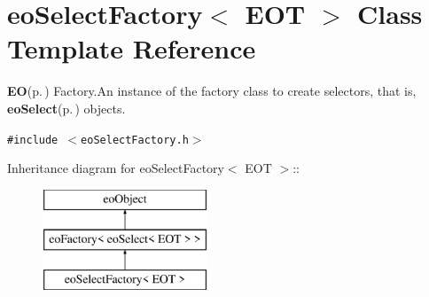 \section{eo\-Select\-Factory$<$ EOT $>$ Class Template Reference}
\label{classeo_select_factory}
{\bf EO}{\rm (p.\,\pageref{class_e_o})} Factory.An instance of the factory class to create selectors, that is, {\bf eo\-Select}{\rm (p.\,\pageref{classeo_select})} objects.  


{\tt \#include $<$eo\-Select\-Factory.h$>$}

Inheritance diagram for eo\-Select\-Factory$<$ EOT $>$::\begin{figure}[H]
\begin{center}
\leavevmode
\includegraphics[height=3cm]{classeo_select_factory}
\end{center}
\end{figure}
